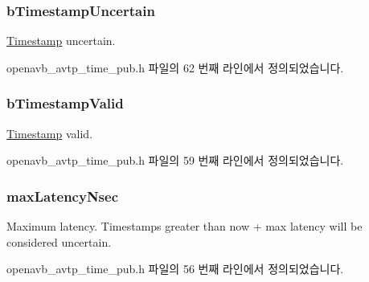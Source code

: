 \subsubsection[{\texorpdfstring{b\+Timestamp\+Uncertain}{bTimestampUncertain}}]{ b\+Timestamp\+Uncertain}\hypertarget{structavtp__time__t_afc9066510178b2c6faf69cf4330e79d8}{}\label{structavtp__time__t_afc9066510178b2c6faf69cf4330e79d8}


\hyperlink{class_timestamp}{Timestamp} uncertain. 



openavb\+\_\+avtp\+\_\+time\+\_\+pub.\+h 파일의 62 번째 라인에서 정의되었습니다.

\subsubsection[{\texorpdfstring{b\+Timestamp\+Valid}{bTimestampValid}}]{ b\+Timestamp\+Valid}\hypertarget{structavtp__time__t_a0f80bf7d63fada1825c25ed77cc43848}{}\label{structavtp__time__t_a0f80bf7d63fada1825c25ed77cc43848}


\hyperlink{class_timestamp}{Timestamp} valid. 



openavb\+\_\+avtp\+\_\+time\+\_\+pub.\+h 파일의 59 번째 라인에서 정의되었습니다.

\subsubsection[{\texorpdfstring{max\+Latency\+Nsec}{maxLatencyNsec}}]{ max\+Latency\+Nsec}\hypertarget{structavtp__time__t_a4f0c56f80049057fe9f41d4b15a3d127}{}\label{structavtp__time__t_a4f0c56f80049057fe9f41d4b15a3d127}


Maximum latency. Timestamps greater than now + max latency will be considered uncertain. 



openavb\+\_\+avtp\+\_\+time\+\_\+pub.\+h 파일의 56 번째 라인에서 정의되었습니다.

